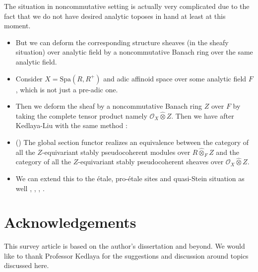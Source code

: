 \documentclass[11pt]{report}
\begin{document}
\indent The situation in noncommutative setting is actually very complicated due to the fact that we do not have desired analytic toposes in hand at least at this moment. 
\begin{itemize}

\justifying

\item<1-> But we can deform the corresponding structure sheaves (in the sheafy situation) over analytic field by a noncommutative Banach ring over the same analytic field. 

\item<2-> Consider $X=\mathrm{Spa}(R,R^+)$ and adic affinoid space over some analytic field $F$, which is not just a pre-adic one. 

\item<3-> Then we deform the sheaf by a noncommutative Banach ring $Z$ over $F$ by taking the complete tensor product namely $\mathcal{O}_X\widehat{\otimes}Z$. Then we have after Kedlaya-Liu with the same method \cite[Theorem 2.5.5]{KL2}:

\item<4-> ()
The global section functor realizes an equivalence between the category of all the $Z$-equivariant stably pseudocoherent modules over $R\widehat{\otimes}_F Z$ and the category of all the $Z$-equivariant stably pseudocoherent sheaves over $\mathcal{O}_X\widehat{\otimes}Z$.




\item<5-> We can extend this to the \'etale, pro-\'etale sites and quasi-Stein situation as well \cite[Theorem 2.5.14, Section 2.6, Theorem 3.4.8]{KL2}, \cite{T4}, \cite{T5}, \cite{T6}. 





\end{itemize}



\newpage

\section*{Acknowledgements}
This survey article is based on the author's dissertation \cite{T7} and beyond. We would like to thank Professor Kedlaya for the suggestions and discussion around topics discussed here.	
\end{document}
